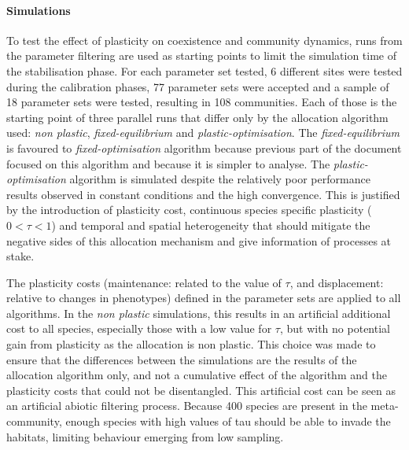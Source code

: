 \paragraph{Simulations}
To test the effect of plasticity on coexistence and community dynamics, runs from the parameter filtering are used as starting points to limit the simulation time of the stabilisation phase. For each parameter set tested, 6 different sites were tested during the calibration phases, 77 parameter sets were accepted and a sample of 18 parameter sets were tested, resulting in 108 communities. Each of those is the starting point of three parallel runs that differ only by the allocation algorithm used: \textit{non plastic}, \textit{fixed-equilibrium} and \textit{plastic-optimisation}. The \textit{fixed-equilibrium} is favoured to \textit{fixed-optimisation} algorithm because previous part of the document focused on this algorithm and because it is simpler to analyse. The \textit{plastic-optimisation} algorithm is simulated despite the relatively poor performance results observed in constant conditions and the high convergence. This is justified by the introduction of plasticity cost, continuous species specific plasticity ($0 < \tau < 1$) and temporal and spatial heterogeneity that should mitigate the negative sides of this allocation mechanism and give information of processes at stake.

The plasticity costs (maintenance: related to the value of $\tau$, and displacement: relative to changes in phenotypes) defined in the parameter sets are applied to all algorithms. In the \textit{non plastic} simulations, this results in an artificial additional cost to all species, especially those with a low value for $\tau$, but with no potential gain from plasticity as the allocation is non plastic. This choice was made to ensure that the differences between the simulations are the results of the allocation algorithm only, and not a cumulative effect of the algorithm and the plasticity costs that could not be disentangled. This artificial cost can be seen as an artificial abiotic filtering process. Because 400 species are present in the meta-community, enough species with high values of tau should be able to invade the habitats, limiting behaviour emerging from low sampling.




